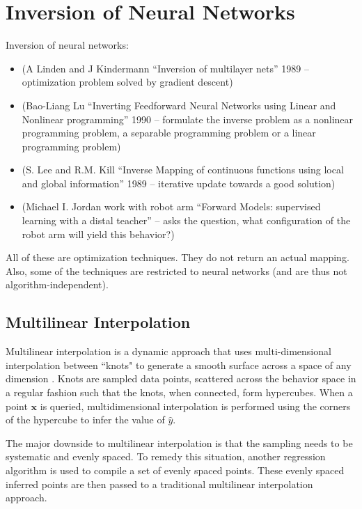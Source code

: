 \section{Inversion of Neural Networks}
Inversion of neural networks: 
\begin{itemize}
\item (A Linden and J Kindermann ``Inversion of multilayer nets'' 1989 -- optimization problem solved by gradient descent) 
\item (Bao-Liang Lu ``Inverting Feedforward Neural Networks using Linear and Nonlinear programming'' 1990 -- formulate the inverse problem as a nonlinear programming problem, a separable programming problem or a linear programming problem)
\item (S. Lee and R.M. Kill ``Inverse Mapping of continuous functions using local and global information'' 1989 -- iterative update towards a good solution)
\item (Michael I. Jordan work with robot arm ``Forward Models: supervised learning with a distal teacher'' -- asks the question, what configuration of the robot arm will yield this behavior?)
\end{itemize}
All of these are optimization techniques. They do not return an actual mapping. Also, some of the techniques are restricted to neural networks (and are thus not algorithm-independent).



\subsection{Multilinear Interpolation}

Multilinear interpolation is a dynamic approach that uses multi-dimensional interpolation between ``knots" to generate a smooth surface across a space of any dimension \cite{davies1997multidimensional}.
Knots are sampled data points, scattered across the behavior space in a regular fashion such that the knots, when connected, form hypercubes.
When a point $\mathbf x$ is queried, multidimensional interpolation is performed using the corners of the hypercube to infer the value of $\hat y$.

The major downside to multilinear interpolation is that the sampling needs to be systematic and evenly spaced.
To remedy this situation, another regression algorithm is used to compile a set of evenly spaced points.
These evenly spaced inferred points are then passed to a traditional multilinear interpolation approach.

